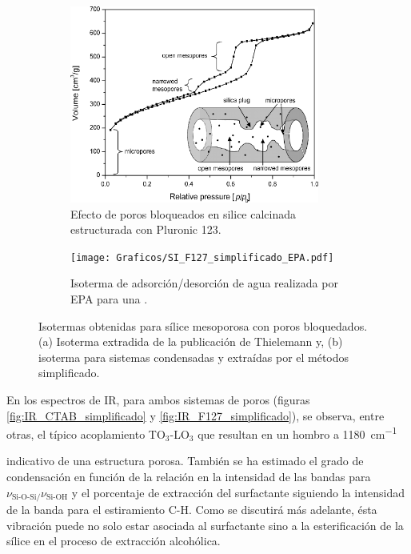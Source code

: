 {			%
			\begin{figure}[th]
		 	   	    \begin{subfigure}[t]{0.49\textwidth}
			       	\includegraphics[width=0.90\textwidth]{Graficos/Doble-distr.png}
			       	\caption{Efecto de poros bloqueados en silice calcinada estructurada con Pluronic 123.}
			       	\label{fig:thielemann}
			   		\end{subfigure}
			   		\begin{subfigure}[t]{0.49\textwidth}
			   	    \texttt{[image: Graficos/SI\_F127\_simplificado\_EPA.pdf]}
			   	    \caption{Isoterma de adsorción/desorción de agua realizada por EPA para una \pdmF.}
			   		\end{subfigure}
					 \caption[Microscopías \pdmF\space tratamiento simplificado.]{Isotermas obtenidas para sílice mesoporosa con poros bloquedados. (a) Isoterma extradida de la publicación de Thielemann\cite{Thielemann2011} y, (b) isoterma para sistemas \pdmF\space condensadas y extraídas por el métodos simplificado.}
					 \label{fig:F127_simplificado_EPA_2}	
				     \end{figure}

			 En los espectros de IR, para ambos sistemas de poros (figuras \ref{fig:IR_CTAB_simplificado} y \ref{fig:IR_F127_simplificado}), se observa, entre otras, el típico acoplamiento TO$_3$-LO$_3$ que resultan en un hombro a \SI{1180}{\cm^{-1}}} indicativo de una estructura porosa\cite{Innocenzi2003}. También se ha estimado el grado de condensación en función de la relación en la intensidad de las bandas para $\nu_{\text{Si-O-Si/}}\nu_{\text{Si-OH}}$ y el porcentaje de extracción del surfactante siguiendo la intensidad de la banda para el estiramiento C-H. Como se discutirá más adelante, ésta vibración puede no solo estar asociada al surfactante sino a la esterificación de la sílice en el proceso de extracción alcohólica.

